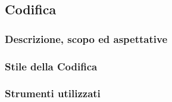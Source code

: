 \subsection{Codifica}

\subsubsection{Descrizione, scopo ed aspettative}

\subsubsection{Stile della Codifica}

\subsubsection{Strumenti utilizzati}


